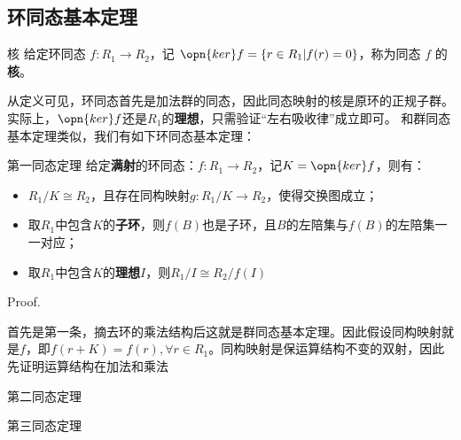 \subsection{环同态基本定理}

\begin{definition}{核}
给定环同态 $f:R_1\rightarrow R_2$，记 $\opn{ker}f=\{r\in R_1|f(r)=0\}$，称为同态 $f$ 的\textbf{核}。
\end{definition}

从定义可见，环同态首先是加法群的同态，因此同态映射的核是原环的正规子群。实际上，$\opn{ker} f$还是$R_1$的\textbf{理想}，只需验证“左右吸收律”成立即可。
和群同态基本定理类似，我们有如下环同态基本定理：

\begin{theorem}{第一同态定理}
给定\textbf{满射}的环同态：$f:R_1\rightarrow R_2$，记$K= \opn{ker}f$，则有：
\begin{itemize}
\item $R_1/K\cong R_2$，且存在同构映射$g:R_1/K\rightarrow R_2$，使得交换图成立；
\item 取$R_1$中包含$K$的\textbf{子环}，则$f(B)$也是子环，且$B$的左陪集与$f(B)$的左陪集一一对应；
\item 取$R_1$中包含$K$的\textbf{理想}$I$，则$R_1/I \cong R_2/f(I)$
\end{itemize}
\end{theorem}
Proof.

首先是第一条，摘去环的乘法结构后这就是群同态基本定理。因此假设同构映射就是$f$，即$f(r+K)=f(r),\forall r\in R_1$。同构映射是保运算结构不变的双射，因此先证明运算结构在加法和乘法

\begin{theorem}{第二同态定理}

\end{theorem}

\begin{theorem}{第三同态定理}

\end{theorem}



